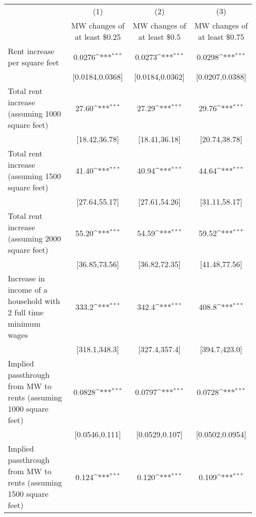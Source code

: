 {
\def\sym#1{\ifmmode^{#1}\else\(^{#1}\)\fi}
\begin{tabular}{l*{3}{c}}
\hline\hline
            &\multicolumn{1}{c}{(1)}        &\multicolumn{1}{c}{(2)}        &\multicolumn{1}{c}{(3)}        \\
            &\multicolumn{1}{c}{MW changes of at least \$0.25}&\multicolumn{1}{c}{MW changes of at least \$0.5}&\multicolumn{1}{c}{MW changes of at least \$0.75}\\
\hline
Rent increase per square feet&                0.0276\sym{***}&                0.0273\sym{***}&                0.0298\sym{***}\\
            &       [0.0184,0.0368]         &       [0.0184,0.0362]         &       [0.0207,0.0388]         \\
[1em]
Total rent increase (assuming 1000 square feet)&                 27.60\sym{***}&                 27.29\sym{***}&                 29.76\sym{***}\\
            &         [18.42,36.78]         &         [18.41,36.18]         &         [20.74,38.78]         \\
[1em]
Total rent increase (assuming 1500 square feet)&                 41.40\sym{***}&                 40.94\sym{***}&                 44.64\sym{***}\\
            &         [27.64,55.17]         &         [27.61,54.26]         &         [31.11,58.17]         \\
[1em]
Total rent increase (assuming 2000 square feet)&                 55.20\sym{***}&                 54.59\sym{***}&                 59.52\sym{***}\\
            &         [36.85,73.56]         &         [36.82,72.35]         &         [41.48,77.56]         \\
[1em]
Increase in income of a household with 2 full time minimum wages&                 333.2\sym{***}&                 342.4\sym{***}&                 408.8\sym{***}\\
            &         [318.1,348.3]         &         [327.4,357.4]         &         [394.7,423.0]         \\
[1em]
Implied passthrough from MW to rents (assuming 1000 square feet)&                0.0828\sym{***}&                0.0797\sym{***}&                0.0728\sym{***}\\
            &        [0.0546,0.111]         &        [0.0529,0.107]         &       [0.0502,0.0954]         \\
[1em]
Implied passthrough from MW to rents (assuming 1500 square feet)&                 0.124\sym{***}&                 0.120\sym{***}&                 0.109\sym{***}\\

\end{tabular}}
